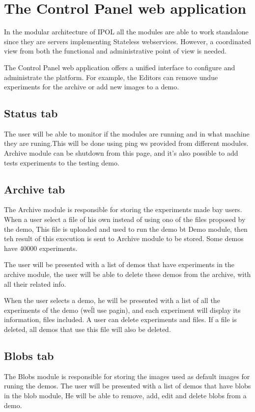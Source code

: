\section{The Control Panel web application}
In the modular architecture of IPOL all the modules are able to work standalone since they are servers implementing Stateless webservices. However, a coordinated view from both the functional and administrative point of view is needed.

The Control Panel web application offers a unified interface to configure and administrate the platform. For example, the Editors can remove undue experiments for the archive or add new images to a demo.

\subsection{Status tab}
The user will be able to monitor if the modules are running and in what machine they are runing.This will be done using ping ws provided from different modules.
Archive module can be shutdown from this page, and it's also possible to add tests experiments to the testing demo.

\subsection{Archive tab}
The Archive module is responsible for storing the experiments made bay users. When a user select a file of his own instead of using ono of the files proposed by the demo, This file is uploaded and used to run the demo bt Demo module, then teh result of this execution is sent to Archive module to be stored. Some demos have 40000 experiments.

The user will be presented with a list of demos that have experiments in the archive module, the user will be able to delete these demos from the archive, with all their related info.

When the user selects a demo, he will be presented with a list of all the experiments of the demo (we\'ll use pagin), and each experiment will display its information, files included. A user can delete experiments and files. If a file is deleted, all demos that use this file will also be deleted.


\subsection{Blobs tab}
The Blobs module is responsible for storing the images used as default images for runing the demos.
The user will be presented with a list of demos that have blobs in the blob module,
He will be able to remove, add, edit and delete blobs from a demo.

